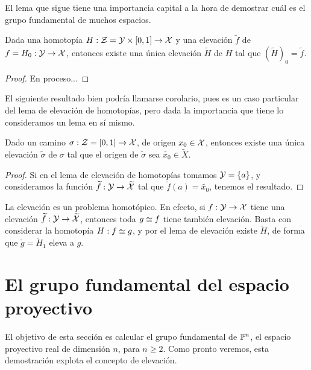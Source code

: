 El lema que sigue tiene una importancia capital a la hora de demostrar cuál es el grupo fundamental de muchos espacios.

\begin{lem}
	\label{grf_lema_elevacion_homotopias}
	Dada una homotopía $H:\mathcal{Z}=\mathcal{Y}\times [0,1]\to\mathcal{X}$ y una elevación $\widetilde{f}$ de $f=H_0:\mathcal{Y}\to\mathcal{X}$, entonces existe una única elevación $\widetilde{H}$ de $H$ tal que $(\widetilde{H})_0=\widetilde{f}$.
	
	\begin{proof}
		En proceso...
	\end{proof}
\end{lem}

El siguiente resultado bien podría llamarse corolario, pues es un caso particular del lema de elevación de homotopías, pero dada la importancia que tiene lo consideramos un lema en sí mismo.

\begin{lem}
	\label{grf_lema_elevacion_caminos}
	Dado un camino $\sigma:\mathcal{Z}= [0,1]\to\mathcal{X}$, de origen $x_0\in\mathcal{X}$, entonces existe una única elevación $\widetilde{\sigma}$ de $\sigma$ tal que el origen de $\widetilde{\sigma}$ sea $\widetilde{x_0}\in\widetilde{X}$.
	
	\begin{proof}
		Si en el lema de elevación de homotopías tomamos $\mathcal{Y}=\{a\}$, y consideramos la función $\widetilde{f}:\mathcal{Y}\to \widetilde{\mathcal{X}}$ tal que $\widetilde{f}(a)=\widetilde{x_0}$, tenemos el resultado.
	\end{proof}
\end{lem}

\begin{obs}
	La elevación es un problema homotópico. En efecto, si $f:\mathcal{Y}\to\mathcal{X}$ tiene una elevación $\widetilde{f}:\mathcal{Y}\to\widetilde{\mathcal{X}}$, entonces toda $g\mathrel{\smash{\underset{}{\simeq}}} f$ tiene también elevación.  Basta con considerar la homotopía $H:f\mathrel{\smash{\underset{}{\simeq}}} g$, y por el lema de elevación existe $\widetilde{H}$, de forma que $\widetilde{g} = \widetilde{H}_1$ eleva a $g$.
\end{obs}

\section{El grupo fundamental del espacio proyectivo}

El objetivo de esta sección es calcular el grupo fundamental de $\mathbb{P}^n$, el espacio proyectivo real de dimensión $n$, para $n\geq 2$. Como pronto veremos, esta demostración explota el concepto de elevación. 

